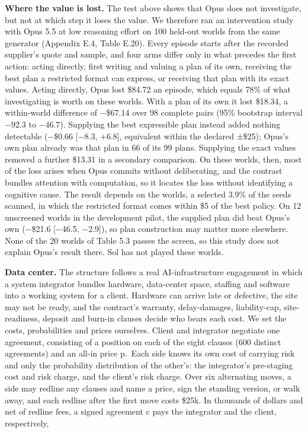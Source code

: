 \textbf{Where the value is lost.} The test above shows that Opus does not investigate, but not at which step it loses the
value. We therefore ran an intervention study with Opus 5.5 at low reasoning effort on 100 held-out worlds from the same
generator (Appendix E.4, Table E.20). Every episode starts after the recorded supplier's quote and sample, and four
arms differ only in what precedes the first action: acting directly, first writing and valuing a plan of its own,
receiving the best plan a restricted format can express, or receiving that plan with its exact values. Acting directly,
Opus lost \$84.72 an episode, which equals 78\% of what investigating is worth on these worlds. With a plan of its own it
lost \$18.34, a within-world difference of −\$67.14 over 98 complete pairs (95\% bootstrap interval −92.3 to −46.7).
Supplying the best expressible plan instead added nothing detectable (−\$0.66 {[}−8.3, +6.8{]}, equivalent within the
declared ±\$25); Opus's own plan already was that plan in 66 of its 99 plans. Supplying the exact values removed a
further \$13.31 in a secondary comparison. On these worlds, then, most of the loss arises when Opus commits without
deliberating, and the contrast bundles attention with computation, so it locates the loss without identifying a
cognitive cause. The result depends on the worlds, a selected 3.9\% of the seeds scanned, in which the restricted format
comes within \$5 of the best policy. On 12 unscreened worlds in the development pilot, the supplied plan did beat Opus's
own (−\$21.6 {[}−46.5, −2.9{]}), so plan construction may matter more elsewhere. None of the 20 worlds of Table 5.3 passes
the screen, so this study does not explain Opus's result there. Sol has not played these worlds.

\textbf{Data center.} The structure follows a real AI-infrastructure engagement in which a system integrator bundles
hardware, data-center space, staffing and software into a working system for a client. Hardware can arrive late or
defective, the site may not be ready, and the contract's warranty, delay-damages, liability-cap, site-readiness,
deposit and burn-in clauses decide who bears each cost. We set the costs, probabilities and prices ourselves. Client
and integrator negotiate one agreement, consisting of a position on each of the eight clauses (600 distinct
agreements) and an all-in price p.~Each side knows its own cost of carrying risk and only the probability distribution
of the other's: the integrator's pre-staging cost and risk charge, and the client's risk charge. Over six alternating
moves, a side may redline any clauses and name a price, sign the standing version, or walk away, and each redline
after the first move costs \$25k. In thousands of dollars and net of redline fees, a signed agreement c pays the
integrator and the client, respectively,

